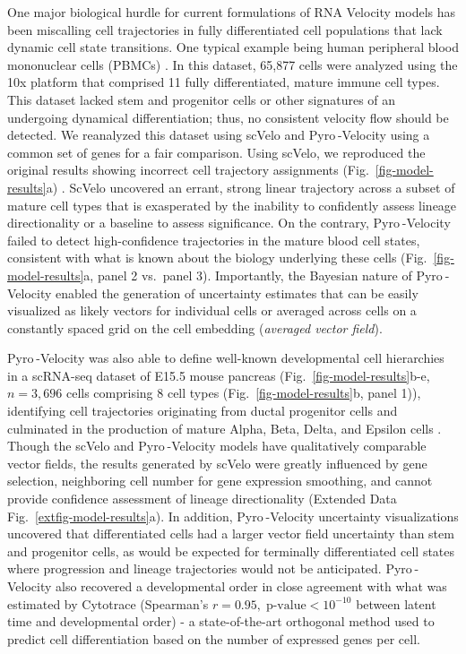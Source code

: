 \documentclass[
  sn-mathphys-num,
  lineno,
  twocolumn]{sn-jnl}
\begin{document}
One major biological hurdle for current formulations of RNA Velocity
models has been miscalling cell trajectories in fully differentiated
cell populations that lack dynamic cell state transitions. One typical
example being human peripheral blood mononuclear cells (PBMCs)
\citep{Zheng2017-bz}. In this dataset, 65,877 cells were analyzed using
the 10x platform that comprised 11 fully differentiated, mature immune
cell types. This dataset lacked stem and progenitor cells or other
signatures of an undergoing dynamical differentiation; thus, no
consistent velocity flow should be detected. We reanalyzed this dataset
using scVelo and Pyro -Velocity using a common set of genes for a fair
comparison. Using scVelo, we reproduced the original results showing
incorrect cell trajectory assignments (Fig.~\ref{fig-model-results}a)
\citep{Bergen2021-qz}. ScVelo uncovered an errant, strong linear
trajectory across a subset of mature cell types \citep{Zheng2017-bz}
that is exasperated by the inability to confidently assess lineage
directionality or a baseline to assess significance. On the contrary,
Pyro -Velocity failed to detect high-confidence trajectories in the
mature blood cell states, consistent with what is known about the
biology underlying these cells (Fig.~\ref{fig-model-results}a, panel 2
vs.~panel 3). Importantly, the Bayesian nature of Pyro -Velocity enabled
the generation of uncertainty estimates that can be easily visualized as
likely vectors for individual cells or averaged across cells on a
constantly spaced grid on the cell embedding (\emph{averaged vector
field}).

Pyro -Velocity was also able to define well-known developmental cell
hierarchies in a scRNA-seq dataset of E15.5 mouse pancreas
(Fig.~\ref{fig-model-results}b-e, \(n=3,696\) cells comprising \(8\)
cell types (Fig.~\ref{fig-model-results}b, panel 1)), identifying cell
trajectories originating from ductal progenitor cells and culminated in
the production of mature Alpha, Beta, Delta, and Epsilon cells
\citep{Bastidas-Ponce2019-lf}. Though the scVelo and Pyro -Velocity
models have qualitatively comparable vector fields, the results
generated by scVelo were greatly influenced by gene selection,
neighboring cell number for gene expression smoothing, and cannot
provide confidence assessment of lineage directionality
(Extended Data Fig.~\ref{extfig-model-results}a). In addition,
Pyro -Velocity uncertainty visualizations uncovered that differentiated
cells had a larger vector field uncertainty than stem and progenitor
cells, as would be expected for terminally differentiated cell states
where progression and lineage trajectories would not be anticipated.
Pyro -Velocity also recovered a developmental order in close agreement
with what was estimated by Cytotrace (Spearman's
\(r=0.95, \; \text{p-value} <
10^{-10}\) between latent time and developmental
order)\citep{Gulati2020-xq} - a state-of-the-art orthogonal method used
to predict cell differentiation based on the number of expressed genes
per cell.
\end{document}
